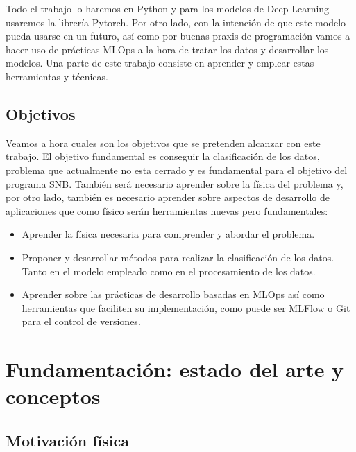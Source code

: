 \documentclass[a4paper,12pt,twoside,titlepage]{article}
\begin{document}
Todo el trabajo lo haremos en Python y para los modelos de Deep Learning usaremos la librería Pytorch. Por otro lado, con la intención de que este modelo pueda usarse en un futuro, así como por buenas praxis de programación vamos a hacer uso de prácticas MLOps a la hora de tratar los datos y desarrollar los modelos. Una parte de este trabajo consiste en aprender y emplear estas herramientas y técnicas.

\subsection{Objetivos}
Veamos a hora cuales son los objetivos que se pretenden alcanzar con este trabajo. El objetivo fundamental es conseguir la clasificación de los datos, problema que actualmente no esta cerrado y es fundamental para el objetivo del programa SNB. También será necesario aprender sobre la física del problema y, por otro lado, también es necesario aprender sobre aspectos de desarrollo de aplicaciones que como físico serán herramientas nuevas pero fundamentales:
\begin{itemize}
  \item Aprender la física necesaria para comprender y abordar el problema.
  \item Proponer y desarrollar métodos para realizar la clasificación de los datos. Tanto en el modelo empleado como en el procesamiento de los datos.
  \item Aprender sobre las prácticas de desarrollo basadas en MLOps así como herramientas que faciliten su implementación, como puede ser MLFlow o Git para el control de versiones.
\end{itemize}


\section{Fundamentación: estado del arte y conceptos}

\subsection{Motivación física}
\end{document}
